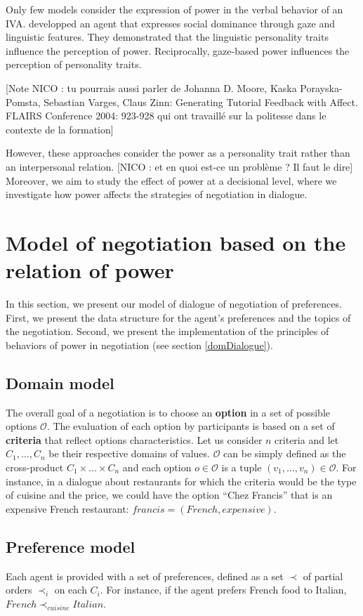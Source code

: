 \documentclass{llncs}
\begin{document}
	Only few models consider the expression of power in the verbal behavior of an IVA. \cite{bee2010bossy} developped an agent that expresses social dominance through gaze and linguistic features. They demonstrated that the linguistic personality traits influence the perception of power. Reciprocally, gaze-based power influences the perception of personality traits.
	
	[Note NICO : tu pourrais aussi parler de Johanna D. Moore, Kaska Porayska-Pomsta, Sebastian Varges, Claus Zinn: Generating Tutorial Feedback with Affect. FLAIRS Conference 2004: 923-928 qui ont travaillé sur la politesse dans le contexte de la formation]
	
	However, these approaches consider the power as a personality trait rather than an interpersonal relation. [NICO : et en quoi est-ce un problème ? Il faut le dire]
	Moreover, we aim to study the effect of power at a decisional level, where we investigate how power affects the strategies of negotiation in dialogue.
	
	
	\section{Model of negotiation based on the relation of power}
	In this section, we present our model of dialogue of negotiation of preferences.	
	First, we present the data structure for the agent's preferences and the topics of the negotiation. Second, we present the implementation of the principles of behaviors of power in negotiation (see section \ref{domDialogue}).

	\subsection{Domain model}
	The overall goal of a negotiation is to choose an \textbf{option} in a set of possible options $\mathcal{O}$. The evaluation of each option by participants is based on a set of \textbf{criteria} that reflect options characteristics. Let us consider $n$ criteria and let $C_1,\ldots,C_n$ be their respective domains of values. $\mathcal{O}$ can be simply defined as the cross-product $C_1\times\ldots\times C_n$ and each option $o\in\mathcal{O}$ is a tuple $(v_1,\ldots,v_n)\in\mathcal{O}$. For instance, in a dialogue about restaurants for which the criteria would be the type of cuisine and the price, we could have the option ``Chez Francis'' that is an expensive French restaurant: $francis=(French,expensive)$.
	
	\subsection{Preference model} 
	Each agent is provided with a set of preferences, defined as a set $\prec$ of partial orders $\prec_i$ on each $C_i$. For instance, if the agent prefers French food to Italian, $French\prec_{cuisine}Italian$.
	
\end{document}
